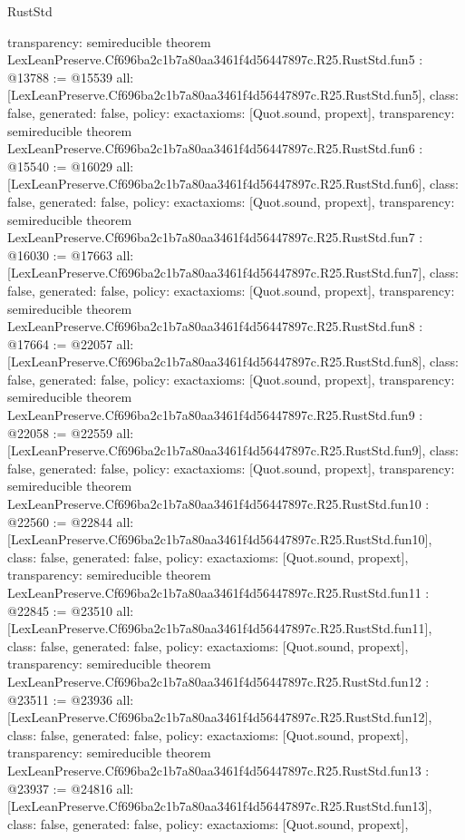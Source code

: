 \begin{lexlean}{RustStd}
\begin{coremodule}
{  transparency: semireducible
}
theorem LexLeanPreserve.Cf696ba2c1b7a80aa3461f4d56447897c.R25.RustStd.fun5 : @13788 := @15539 {
  all: [LexLeanPreserve.Cf696ba2c1b7a80aa3461f4d56447897c.R25.RustStd.fun5],
  class: false,
  generated: false,
  policy: exact{axioms: [Quot.sound, propext]},
  transparency: semireducible
}
theorem LexLeanPreserve.Cf696ba2c1b7a80aa3461f4d56447897c.R25.RustStd.fun6 : @15540 := @16029 {
  all: [LexLeanPreserve.Cf696ba2c1b7a80aa3461f4d56447897c.R25.RustStd.fun6],
  class: false,
  generated: false,
  policy: exact{axioms: [Quot.sound, propext]},
  transparency: semireducible
}
theorem LexLeanPreserve.Cf696ba2c1b7a80aa3461f4d56447897c.R25.RustStd.fun7 : @16030 := @17663 {
  all: [LexLeanPreserve.Cf696ba2c1b7a80aa3461f4d56447897c.R25.RustStd.fun7],
  class: false,
  generated: false,
  policy: exact{axioms: [Quot.sound, propext]},
  transparency: semireducible
}
theorem LexLeanPreserve.Cf696ba2c1b7a80aa3461f4d56447897c.R25.RustStd.fun8 : @17664 := @22057 {
  all: [LexLeanPreserve.Cf696ba2c1b7a80aa3461f4d56447897c.R25.RustStd.fun8],
  class: false,
  generated: false,
  policy: exact{axioms: [Quot.sound, propext]},
  transparency: semireducible
}
theorem LexLeanPreserve.Cf696ba2c1b7a80aa3461f4d56447897c.R25.RustStd.fun9 : @22058 := @22559 {
  all: [LexLeanPreserve.Cf696ba2c1b7a80aa3461f4d56447897c.R25.RustStd.fun9],
  class: false,
  generated: false,
  policy: exact{axioms: [Quot.sound, propext]},
  transparency: semireducible
}
theorem LexLeanPreserve.Cf696ba2c1b7a80aa3461f4d56447897c.R25.RustStd.fun10 : @22560 := @22844 {
  all: [LexLeanPreserve.Cf696ba2c1b7a80aa3461f4d56447897c.R25.RustStd.fun10],
  class: false,
  generated: false,
  policy: exact{axioms: [Quot.sound, propext]},
  transparency: semireducible
}
theorem LexLeanPreserve.Cf696ba2c1b7a80aa3461f4d56447897c.R25.RustStd.fun11 : @22845 := @23510 {
  all: [LexLeanPreserve.Cf696ba2c1b7a80aa3461f4d56447897c.R25.RustStd.fun11],
  class: false,
  generated: false,
  policy: exact{axioms: [Quot.sound, propext]},
  transparency: semireducible
}
theorem LexLeanPreserve.Cf696ba2c1b7a80aa3461f4d56447897c.R25.RustStd.fun12 : @23511 := @23936 {
  all: [LexLeanPreserve.Cf696ba2c1b7a80aa3461f4d56447897c.R25.RustStd.fun12],
  class: false,
  generated: false,
  policy: exact{axioms: [Quot.sound, propext]},
  transparency: semireducible
}
theorem LexLeanPreserve.Cf696ba2c1b7a80aa3461f4d56447897c.R25.RustStd.fun13 : @23937 := @24816 {
  all: [LexLeanPreserve.Cf696ba2c1b7a80aa3461f4d56447897c.R25.RustStd.fun13],
  class: false,
  generated: false,
  policy: exact{axioms: [Quot.sound, propext]},
}
\end{coremodule}
\end{lexlean}
